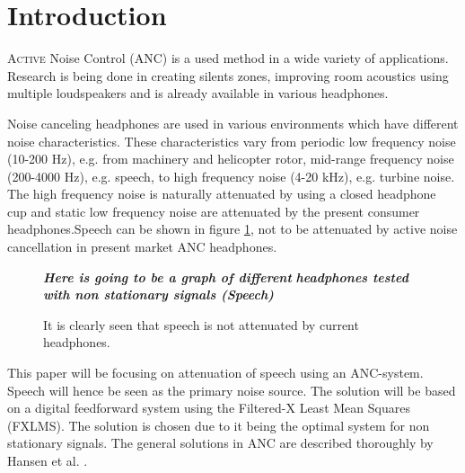 \section{Introduction}
\lettrine[lines=2]{A}{ctive} Noise Control (ANC) is a used method in a wide variety of applications. Research is being done in creating silents zones\cite{SilentZones}, improving room acoustics using multiple loudspeakers\cite{CAPS} and is already available in various headphones.

Noise canceling headphones are used in various environments which have different noise characteristics. These characteristics vary from periodic low frequency noise (10-200 Hz), e.g. from machinery and helicopter rotor\cite{LowFrequency}, mid-range frequency noise (200-4000 Hz), e.g. speech\cite{MidFrequency}, to high frequency noise (4-20 kHz), e.g. turbine noise\cite{LowFrequency}. The high frequency noise is naturally attenuated by using a closed headphone cup\cite{naturalAttenuation} and static low frequency noise are attenuated by the present consumer headphones\cite{ConsumerANC}.Speech can be shown in figure \ref{fig:ANCcompare}, not to be attenuated by active noise cancellation in present market ANC headphones.

\begin{figure}[H]
	\centering
	\textbf{\textit{Here is going to be a graph of different}}
	\textbf{\textit{ headphones tested with non stationary signals (Speech)}}
	\caption{It is clearly seen that speech is not attenuated by current headphones.}
	\label{fig:ANCcompare}
\end{figure}


This paper will be focusing on attenuation of speech using an ANC-system. Speech will hence be seen as the primary noise source. The solution will be based on a digital feedforward system using the Filtered-X Least Mean Squares (FXLMS). The solution is chosen due to it being the optimal system for non stationary signals\cite{Hansen2}. The general solutions in ANC are described thoroughly by Hansen et al. \cite{Hansen}.

